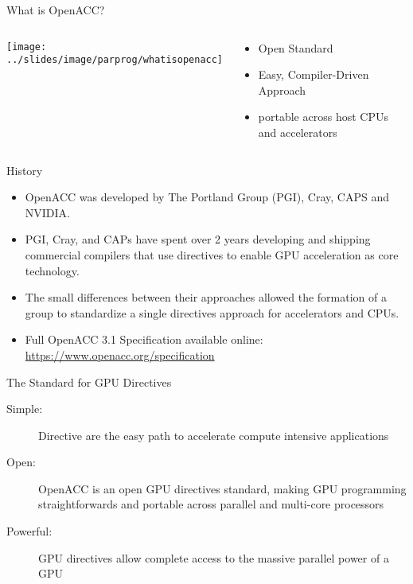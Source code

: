 \documentclass[10pt,t]{beamer}
\begin{document}
\begin{frame}[allowframebreaks]{What is OpenACC?}
  \begin{columns}
  \begin{center}
    \texttt{[image: ../slides/image/parprog/whatisopenacc]}
  \end{center}
  \begin{block}{}
    \begin{itemize}
      \item Open Standard
      \item Easy, Compiler-Driven Approach
      \item portable across host CPUs and accelerators
    \end{itemize}
  \end{block}
  \end{columns}	

  \framebreak

  \begin{exampleblock}{History}
    \begin{itemize}
    \item OpenACC was developed by The Portland Group (PGI), Cray, CAPS and NVIDIA. 
    \item PGI, Cray, and CAPs have spent over 2 years developing and shipping commercial compilers that use directives to enable GPU acceleration as core technology. 
    \item The small differences between their approaches allowed the formation of a group to standardize a single directives approach for accelerators and CPUs.
    \item Full OpenACC 3.1 Specification available online: \url{https://www.openacc.org/specification}
    \end{itemize}
  \end{exampleblock}

  \begin{exampleblock}{The Standard for GPU Directives}
    \begin{description}
      \item[Simple:] Directive are the easy path to accelerate compute intensive applications
      \item[Open:] OpenACC is an open GPU directives standard, making GPU programming straightforwards and portable across parallel and multi-core processors
      \item[Powerful:] GPU directives allow complete access to the massive parallel power of a GPU
    \end{description}
  \end{exampleblock}
\end{frame}
\end{document}
